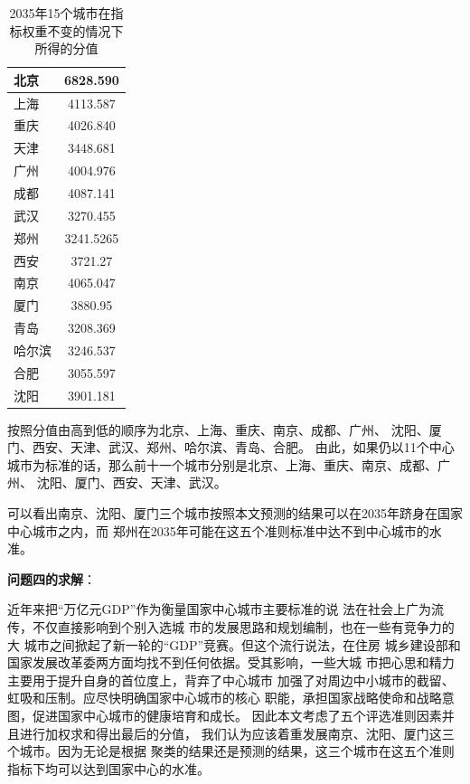 \documentclass[openany,oneside]{ctexbook}
\begin{document}
\begin{table}[!htp]
   \centering
   \begin{tabular}{|l|c|}
      \hline

      北京&6828.590 \\ \hline
      上海&4113.587 \\ \hline
      重庆&4026.840 \\ \hline
      天津&3448.681 \\ \hline
      广州&4004.976 \\ \hline
      成都&4087.141 \\ \hline
      武汉&3270.455 \\ \hline
      郑州&3241.5265 \\ \hline
      西安&3721.27 \\ \hline
      南京&4065.047 \\ \hline
      厦门&3880.95 \\ \hline
      青岛&3208.369 \\ \hline
      哈尔滨&3246.537 \\ \hline
      合肥&3055.597 \\ \hline
      沈阳&3901.181 \\ \hline
   \end{tabular}
   \caption{2035年15个城市在指标权重不变的情况下所得的分值}
   
\end{table}
按照分值由高到低的顺序为北京、上海、重庆、南京、成都、广州、
沈阳、厦门、西安、天津、武汉、郑州、哈尔滨、青岛、合肥。
由此，如果仍以11个中心城市为标准的话，那么前十一个城市分别是北京、上海、重庆、南京、成都、广州、
沈阳、厦门、西安、天津、武汉。

可以看出南京、沈阳、厦门三个城市按照本文预测的结果可以在2035年跻身在国家中心城市之内，而
郑州在2035年可能在这五个准则标准中达不到中心城市的水准。


{\bfseries 问题四的求解}：

近年来把“万亿元GDP”作为衡量国家中心城市主要标准的说
法在社会上广为流传，不仅直接影响到个别入选城
市的发展思路和规划编制，也在一些有竞争力的大
城市之间掀起了新一轮的“GDP”竞赛。但这个流行说法，在住房
城乡建设部和国家发展改革委两方面均找不到任何依据。受其影响，一些大城
市把心思和精力主要用于提升自身的首位度上，背弃了中心城市
加强了对周边中小城市的截留、虹吸和压制。应尽快明确国家中心城市的核心
职能，承担国家战略使命和战略意图，促进国家中心城市的健康培育和成长。
因此本文考虑了五个评选准则因素并且进行加权求和得出最后的分值，
我们认为应该着重发展南京、沈阳、厦门这三个城市。因为无论是根据
聚类的结果还是预测的结果，这三个城市在这五个准则指标下均可以达到国家中心的水准。
\end{document}
